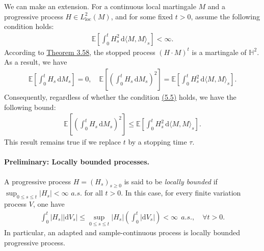 \documentclass{article}
\numberwithin{equation}{section}
\newcommand{\E}{\mathbb{E}}
\renewcommand{\d}{\mathrm{d}}
\theoremstyle{plain}
\theoremstyle{definition}
\begin{document}
We can make an extension. For a continuous local martingale $M$ and a progressive process $H\in L^2_{\mathrm{loc}}(M)$, and for some fixed $t>0$, assume the following condition holds:
\begin{align*}
	\E\left[\int_0^t H_s^2\,\d \langle M,M\rangle_s\right]<\infty.\tag{5.5}\label{eq:5.5}
\end{align*}
According to \hyperref[thm:3.58]{Theorem 3.58}, the stopped process $(H\cdot M)^t$ is a martingale of $\mathbb{H}^2$. As a result, we have
\begin{align*}
	\E\left[\int_0^tH_s\,\d M_s\right]=0,\quad \E\left[\left(\int_0^t H_s\,\d M_s\right)^2\right]=\E\left[\int_0^t H_s^2\,\d \langle M,M\rangle_s\right].
\end{align*}
Consequently, regardless of whether the condition \hyperref[eq:5.5]{(5.5)} holds, we have the following bound:
\begin{align*}
	\E\left[\left(\int_0^t H_s\,\d M_s\right)^2\right]\leq\E\left[\int_0^t H_s^2\,\d \langle M,M\rangle_s\right]. \tag{5.6}\label{eq:5.6}
\end{align*}
This result remains true if we replace $t$ by a stopping time $\tau$.

\paragraph{Preliminary: Locally bounded processes.} A progressive process $H=(H_s)_{s\geq 0}$ is said to be \textit{locally bounded} if $\sup_{0\leq s\leq t}\vert H_s\vert <\infty$ $a.s.$ for all $t>0$. In this case, for every finite variation process $V$, one have
\begin{align*}
	\int_0^t \vert H_s\vert\left\vert \d V_s\right\vert\leq \sup_{0\leq s\leq t}\vert H_s\vert\left(\int_0^t\vert \d V_s\vert\right) < \infty\ \ a.s.,\quad\forall t>0.
\end{align*}
In particular, an adapted and sample-continuous process is locally bounded progressive process. 
\end{document}
